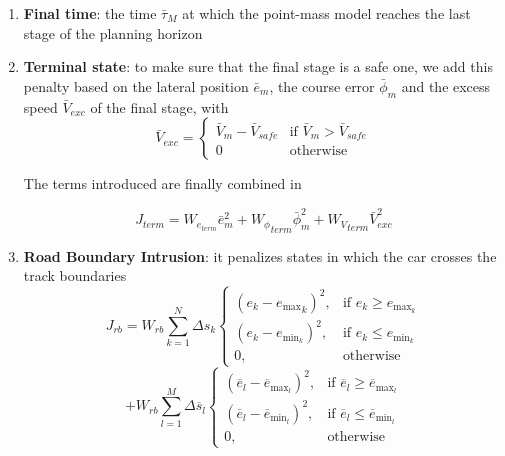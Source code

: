 \documentclass[a4paper, onecolumn, 12pt]{article}
\begin{document}
\begin{enumerate}
    \item \textbf{Final time}: the time $\bar{\tau}_M$ at which the point-mass model reaches the last stage of the planning horizon
    \item \textbf{Terminal state}: to make sure that the final stage is a safe one, we add this penalty based on the 
    lateral position ${\bar{e}}_m$, the course error ${\bar{\phi}}_m$ and the excess speed ${\bar{V}}_{exc}$ of the final stage, with
    \begin{equation}
    {\bar{V}}_{exc} = 
    \left\{
	\begin{array}{ll}
		{\bar{V}}_m - {{\bar{V}}_{safe}}
        & \mbox{if } {\bar{V}}_m > {{\bar{V}}_{safe}} \\
	0 & \mbox{otherwise }
	\end{array}
    \right.
    \end{equation}

    The terms introduced are finally combined in
    
    \begin{equation}{J}_{term} = W_{e_{term}}{\bar{e}}_m^2 + {W_{\phi}}_{term}{\bar{\phi}}_m^2 + {W_V}_{term}{\bar{V}}_{exc}^2
    \end{equation}

    \item \textbf{Road Boundary Intrusion}: it penalizes states in which the car crosses the track boundaries
    \begin{equation}
    J_{rb} = W_{rb}\sum_{k=1}^{N} \Delta s_k \begin{cases}
    (e_k - {e_{\text{max}}}_k)^2, & \text{if } e_k \geq e_{\text{max}_k} \\
    (e_k - e_{\text{min}_k})^2, & \text{if } e_k \leq e_{\text{min}_k} \\
    0, & \text{otherwise}
    \end{cases}
    \end{equation}
    \[  + W_{rb}\sum_{l=1}^{M} \Delta\overline{s}_l \begin{cases}
    (\overline{e}_l - \overline{e}_{\text{max}_l})^2, & \text{if } \overline{e}_l \geq \overline{e}_{\text{max}_l} \\
    (\overline{e}_l - \overline{e}_{\text{min}_l})^2, & \text{if } \overline{e}_l \leq \overline{e}_{\text{min}_l} \\
    0, & \text{otherwise}
    \end{cases}
    \]


\end{enumerate}
\end{document}
